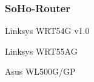 \subsubsection{SoHo-Router}

\begin{wlandevice}{Linksys WRT54G v1.0}
\wlanchipset
\wlanieeestandard
\wlanmode
\wlansecurity
\wlandriver
\wlanprice
\wlaninstall
\end{wlandevice}

\begin{wlandevice}{Linksys WRT55AG}
\wlanchipset
\wlanieeestandard
\wlanmode
\wlansecurity
\wlandriver
\wlanprice
\wlaninstall
\end{wlandevice}

\begin{wlandevice}{Asus WL500G/GP}
\wlanchipset
\wlanieeestandard
\wlanmode
\wlansecurity
\wlandriver
\wlanprice
\wlaninstall
\end{wlandevice}
